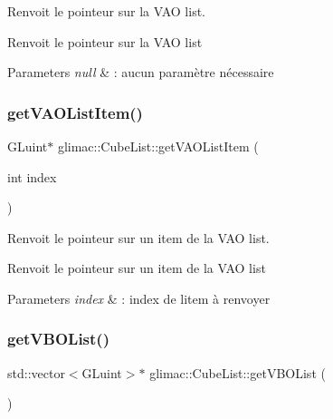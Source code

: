 Renvoit le pointeur sur la V\+AO list. 

Renvoit le pointeur sur la V\+AO list


\begin{DoxyParams}{Parameters}
{\em null} & \+: aucun paramètre nécessaire \\
\hline
\end{DoxyParams}
\mbox{\label{classglimac_1_1CubeList_a46cfba24380b3421086a0ac97ae4e789}} 
\subsubsection{\texorpdfstring{get\+V\+A\+O\+List\+Item()}{getVAOListItem()}}
{\footnotesize\ttfamily G\+Luint$\ast$ glimac\+::\+Cube\+List\+::get\+V\+A\+O\+List\+Item (\begin{DoxyParamCaption}\item[{int}]{index }\end{DoxyParamCaption})\hspace{0.3cm}{\ttfamily [inline]}}



Renvoit le pointeur sur un item de la V\+AO list. 

Renvoit le pointeur sur un item de la V\+AO list


\begin{DoxyParams}{Parameters}
{\em index} & \+: index de l\textquotesingle{}item à renvoyer \\
\hline
\end{DoxyParams}
\mbox{\label{classglimac_1_1CubeList_a82eae5adc714b8f00a23e7ad8d2aee85}} 
\subsubsection{\texorpdfstring{get\+V\+B\+O\+List()}{getVBOList()}}
{\footnotesize\ttfamily std\+::vector$<$G\+Luint$>$$\ast$ glimac\+::\+Cube\+List\+::get\+V\+B\+O\+List (\begin{DoxyParamCaption}{ }\end{DoxyParamCaption})\hspace{0.3cm}{\ttfamily [inline]}}




